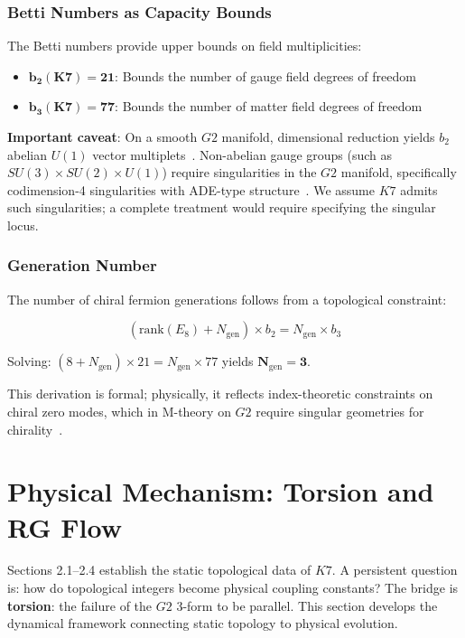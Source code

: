 \documentclass[11pt,a4paper]{article}
\newcommand{\E}{\mathrm{E}}
\newcommand{\Gtwo}{\mathrm{G}_2}
\newcommand{\Kseven}{K_7}
\newcommand{\SU}{\mathrm{SU}}
\newcommand{\U}{\mathrm{U}}
\newcommand{\rank}{\mathrm{rank}}
\def\Gtwo{G2}%
\def\Kseven{K7}%
\def\E{E}%
\def\SU{SU}%
\def\U{U}%
\begin{document}
\subsubsection{Betti Numbers as Capacity Bounds}

The Betti numbers provide upper bounds on field multiplicities:

\begin{itemize}
\item $\mathbf{b_2(\Kseven) = 21}$: Bounds the number of gauge field degrees of freedom
\item $\mathbf{b_3(\Kseven) = 77}$: Bounds the number of matter field degrees of freedom
\end{itemize}

\textbf{Important caveat}: On a smooth $\Gtwo$ manifold, dimensional reduction yields $b_2$ abelian $\U(1)$ vector multiplets~\cite{acharya2004}. Non-abelian gauge groups (such as $\SU(3) \times \SU(2) \times \U(1)$) require singularities in the $\Gtwo$ manifold, specifically codimension-4 singularities with ADE-type structure~\cite{acharya2002,acharya2001}. We assume $\Kseven$ admits such singularities; a complete treatment would require specifying the singular locus.

\subsubsection{Generation Number}

The number of chiral fermion generations follows from a topological constraint:

$$(\rank(\E_8) + N_{\mathrm{gen}}) \times b_2 = N_{\mathrm{gen}} \times b_3$$

Solving: $(8 + N_{\mathrm{gen}}) \times 21 = N_{\mathrm{gen}} \times 77$ yields $\mathbf{N_{\mathrm{gen}} = 3}$.

This derivation is formal; physically, it reflects index-theoretic constraints on chiral zero modes, which in M-theory on $\Gtwo$ require singular geometries for chirality~\cite{acharya2001}.

\section{Physical Mechanism: Torsion and RG Flow}

Sections 2.1--2.4 establish the static topological data of $\Kseven$. A persistent question is: how do topological integers become physical coupling constants? The bridge is \textbf{torsion}: the failure of the $\Gtwo$ 3-form to be parallel. This section develops the dynamical framework connecting static topology to physical evolution.
\end{document}
